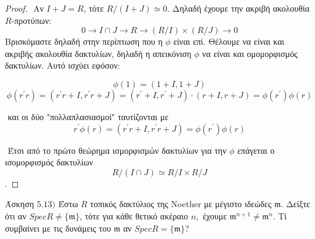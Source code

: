 \documentclass[oneside,a4paper]{article}
\newcommand {\tl}{\textlatin}
\begin{document}
\begin{proof}
	$ $\newline
	Αν $I+J = R$, τότε $R/(I+J) \simeq 0$. Δηλαδή έχουμε την ακριβή ακολουθία $R$-προτύπων: $$ 0 \to I \cap J \to R \to (R/I) \times (R/J) \to 0$$ Βρισκόμαστε δηλαδή στην περίπτωση που η $\phi$ είναι επί. Θέλουμε να είναι και ακριβής ακολουθία δακτυλίων, δηλαδή η απεικόνιση $\phi$ να είναι και ομομορφισμός δακτυλίων. Αυτό ισχύει εφόσον:

	$$\phi(1)=(1+I,1+J)$$
	$$\phi(r^{\prime} r) = (r^{\prime}r + I, r^{\prime}r + J) = (r^{\prime}+I, r^{\prime}+J)\cdot (r+I,r+J) = \phi(r^{\prime}) \phi(r)$$

	$ $\newline
	και οι δύο "πολλαπλασιασμοί" ταυτίζονται με $$r^{\prime}\phi(r) = (r^{\prime}r+I, r^{\prime}r+J) = \phi(r^{\prime}) \phi(r)$$
	
	
	$ $\newline
	Έτσι από το πρώτο θεώρημα ισμορφισμών δακτυλίων για την $\phi$ επάγεται ο ισομορφισμός δακτυλίων
	$$R/(I\cap J) \simeq R/I \times R/J$$.

\end{proof}
\pagebreak

\noindent Άσκηση $5.13)$
\quad Έστω $R$ τοπικός δακτύλιος της \tl{Noether} με μέγιστο ιδεώδες $\mathfrak{m}$. Δείξτε ότι αν $SpecR\ne \{ \mathfrak{m} \}$, τότε για κάθε θετικό ακέραιο $n,$ έχουμε ${{\mathfrak{m}}^{n+1}}\ne {{\mathfrak{m}}^{n}}.$ Τί συμβαίνει με τις δυνάμεις του $\mathfrak{m}$ αν $SpecR = \{ \mathfrak{m} \}$?
\end{document}
